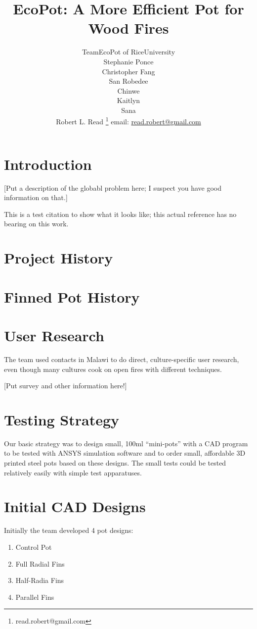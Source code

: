 \documentclass{article}
\title{EcoPot: A More Efficient Pot for Wood Fires}
\author{
  TeamEcoPot of RiceUniversity \\
  Stephanie Ponce \\
  Christopher Fang \\
  San Robedee \\
  Chinwe \\
  Kaitlyn \\
  Sana \\
Robert L. Read
  \thanks{read.robert@gmail.com}
  email: \href{mailto:read.robert@gmail.com}{read.robert@gmail.com}
  }
\begin{document}
\maketitle
\begin{abstract}
\end{abstract}


\section{Introduction}

[Put a description of the globabl problem here; I suspect you
  have good information on that.]

This is a test citation to show what it looks like\cite{softrobotcalc};
this actual reference has no bearing on this work.

\section{Project History}

\section{Finned Pot History}

\section{User Research}

The team used contacts in Malawi to do direct, culture-specific user research,
even though many cultures cook on open fires with different techniques.

[Put survey and other information here!]

\section{Testing Strategy}

Our basic strategy was to design small, 100ml ``mini-pots'' with a CAD program to be
tested with ANSYS simulation software and to order small, affordable
3D printed
steel pots based on these designs.
The small tests could be tested relatively easily with simple test
apparatuses.


\section{Initial CAD Designs}

Initially the team developed 4 pot designs:
\begin{enumerate}
\item Control Pot
\item Full Radial Fins
\item Half-Radia Fins
\item Parallel Fins
\end{enumerate}
\end{document}
